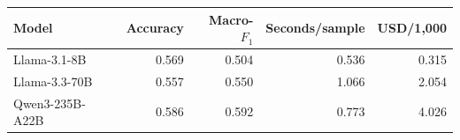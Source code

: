 \begin{tabular}{@{}lrrrr@{}}
\toprule
Model & Accuracy & Macro-$F_1$ & Seconds/sample & USD/1{,}000 \\
\midrule
Llama-3.1-8B & 0.569 & 0.504 & 0.536 & 0.315 \\
Llama-3.3-70B & 0.557 & 0.550 & 1.066 & 2.054 \\
Qwen3-235B-A22B & 0.586 & 0.592 & 0.773 & 4.026 \\
\bottomrule
\end{tabular}

